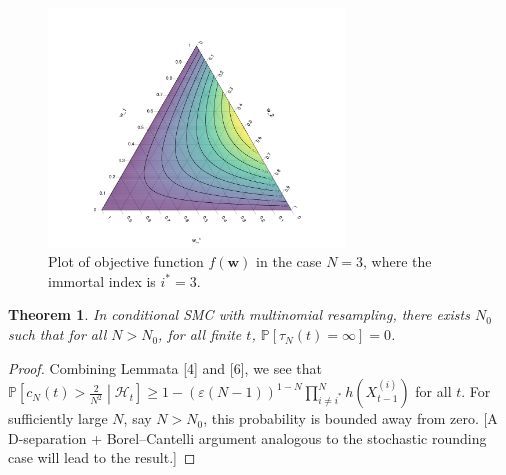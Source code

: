 \documentclass{article}
\newtheorem{thm}{Theorem}
\newcommand{\PR}{\mathbb{P}}
\newcommand{\1}[1]{\mathbb{I}_{#1}}
\begin{document}
\begin{figure}
\centering
\includegraphics[width=0.7\textwidth]{ternplot1.pdf}
\caption{Plot of objective function $f(\mathbf{w})$ in the case $N=3$, where the immortal index is $i^*=3$.}
\label{fig:CSMC_ternaryplot}
\end{figure}


\begin{thm}
In conditional SMC with multinomial resampling, there exists $N_0$ such that for all $N>N_0$, for all finite $t$, $\PR[\tau_N(t) = \infty] =0$.
\end{thm}


\begin{proof}
Combining Lemmata [4] and [6], we see that $\PR \left[c_N(t) > \frac{2}{N^2} \middle| \mathcal{H}_t \right] \geq 1- (\varepsilon(N-1))^{1-N} \prod_{i\neq i^*}^N h(X_{t-1}^{(i)})$ for all $t$. For sufficiently large $N$, say $N>N_0$, this probability is bounded away from zero.
[A D-separation + Borel--Cantelli argument analogous to the stochastic rounding case will lead to the result.]
\end{proof}
\end{document}
